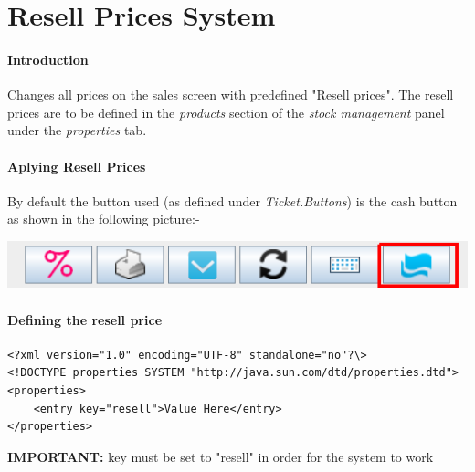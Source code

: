 \chapter{Resell Prices System}

\subsubsection{Introduction}

Changes all prices on the sales screen with predefined "Resell prices". The resell prices are to be defined in the \textit{products} section of the \textit{stock management} panel under the \textit{properties} tab.

\subsubsection{Aplying Resell Prices}
By default the button used (as defined under \textit{Ticket.Buttons}) is the cash button as shown in the following picture:-

\includegraphics[width=\textwidth]{images/resell_prices_btn.png}

\subsubsection{Defining the resell price}

\begin{lstlisting}
<?xml version="1.0" encoding="UTF-8" standalone="no"?\>  
<!DOCTYPE properties SYSTEM "http://java.sun.com/dtd/properties.dtd">
<properties>
	<entry key="resell">Value Here</entry>
</properties>	
\end{lstlisting}

\textbf {IMPORTANT:} key must be set to "resell" in order for the system to work